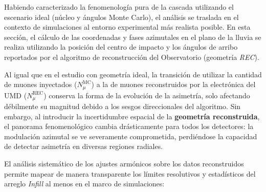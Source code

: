 Habiendo caracterizado la fenomenología pura de la cascada utilizando el escenario ideal (núcleo y ángulos Monte Carlo), el análisis se traslada en el contexto de simulaciones al entorno experimental más realista posible. En esta sección, el cálculo de las coordenadas y fases azimutales en el plano de la lluvia se realiza utilizando la posición del centro de impacto y los ángulos de arribo reportados por el algoritmo de reconstrucción del Observatorio (geometría \textit{REC}).

Al igual que en el estudio con geometría ideal, la transición de utilizar la cantidad de muones inyectados ($N_\mu^{\mathrm{MC}}$) a la de muones reconstruidos por la electrónica del UMD ($N_\mu^{\mathrm{REC}}$) conserva la forma de la evolución de la asimetría, solo afectando débilmente su magnitud debido a los sesgos direccionales del algoritmo. Sin embargo, al introducir la incertidumbre espacial de la \textbf{geometría reconstruida}, el panorama fenomenológico cambia drásticamente para todos los detectores: la modulación azimutal se ve severamente comprometida, perdiéndose la capacidad de detectar asimetría en diversas regiones radiales.

El análisis sistemático de los ajustes armónicos sobre los datos reconstruidos permite mapear de manera transparente los límites resolutivos y estadísticos del arreglo \textit{Infill} al menos en el marco de simulaciones:

